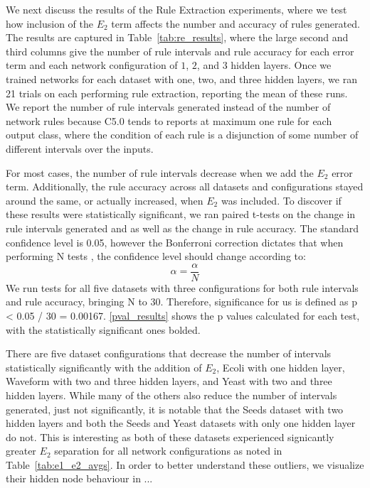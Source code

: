 We next discuss the results of the Rule Extraction experiments,
where we test how inclusion of the $E_2$ term affects the number
and accuracy of rules generated.
The results are
captured in Table~\ref{tab:re_results}, where the large second and
third columns
give the number of rule intervals and rule accuracy for each error term and
each network configuration of $1$, $2$, and $3$ hidden layers.
Once we trained networks for each dataset with
one, two, and three hidden layers, we ran 21 trials on each performing
rule extraction, reporting the mean of these runs. We report the
number of rule intervals generated instead of the number of network
rules because C5.0 tends to reports at maximum one rule for each output
class, where the condition of each rule is a disjunction of some number
of different intervals over the inputs.

For most cases, the number of rule intervals decrease when we add
the $E_2$ error term. Additionally, the rule accuracy across all
datasets and configurations stayed around the same, or actually
increased, when $E_2$ was included. To discover if these results were statistically
significant, we ran paired t-tests on the change in rule intervals
generated and as well as the change in rule accuracy. The standard
confidence level is 0.05, however the Bonferroni correction dictates
that when performing N tests \cite{shaffer1995multiple}, the confidence level should change according
to:
\begin{equation}
  \alpha = \frac{\alpha}{N}
\end{equation}
We run tests for all five datasets with three configurations for both
rule intervals and rule accuracy, bringing N to 30. Therefore,
significance for us is defined as p < 0.05 / 30 =
0.00167. \ref{pval_results} shows the p values calculated for each
test, with the statistically significant ones bolded. 

There are five dataset configurations that decrease the number of
intervals statistically significantly with the addition of $E_2$, Ecoli with one
hidden layer, Waveform with two and three hidden layers, and Yeast
with two and three hidden layers. While many of the others also
reduce the number of intervals generated, just not significantly, it is notable that
the Seeds dataset with two hidden layers and both the
Seeds and Yeast datasets with only one
hidden layer do not. This is interesting as both of these datasets
experienced signicantly greater $E_2$ separation for all network
configurations as noted in Table~\ref{tab:e1_e2_avgs}. In order
to better understand these outliers, we visualize their hidden node
behaviour in ...

